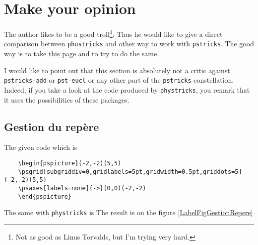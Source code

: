 \section{Make your opinion}

The author likes to be a good troll\footnote{Not as good as Linus Torvalds, but I'm trying very hard.}. Thus he would like to give a direct comparison between \verb+phustricks+ and other way to work with \verb+pstricks+. The good way is to take \href{http://ww2.ac-poitiers.fr/math/spip.php?page=imprime&id_article=134}{this page} and to try to do the same.

I would like to point out that this section is absolutely not a critic against \verb+pstricks-add+ or \verb+pst-eucl+ or any other part of the \verb+pstricks+ constellation. Indeed, if you take a look at the code produced by \verb+phystricks+, you remark that it uses the possibilities of these packages.

\subsection{Gestion du repère}

The given code which is
\begin{verbatim}
	\begin{pspicture}(-2,-2)(5,5)
	\psgrid[subgriddiv=0,gridlabels=5pt,gridwidth=0.5pt,griddots=5](-2,-2)(5,5)
	\psaxes[labels=none]{->}(0,0)(-2,-2)
	\end{pspicture}
\end{verbatim}
The same with \verb+phystricks+ is
The result is on the figure \ref{LabelFigGestionRepere}
\newcommand{\CaptionFigGestionRepere}{Axes and grid}


